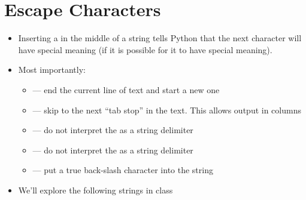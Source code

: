 \documentclass[letterpaper,10pt,english]{sphinxmanual}
\begin{document}
\section{Escape Characters}
\label{\detokenize{lecture_notes/lec03_strings:escape-characters}}\begin{itemize}
\item {} 
Inserting a \sphinxcode{\sphinxupquote{\textbackslash{}}} in the middle of a string tells Python that the
next character will have special meaning (if it is possible for it to
have special meaning).

\item {} 
Most importantly:
\begin{itemize}
\item {} 
 — end the current line of text and start a new one

\item {} 
 — skip to the next “tab stop” in the text. This allows
output in columns

\item {} 
 — do not interpret the  as a string delimiter

\item {} 
 — do not interpret the  as a string delimiter

\item {} 
\sphinxcode{\sphinxupquote{\textbackslash{}\textbackslash{}}} — put a true back-slash character into the string

\end{itemize}

\item {} 
We’ll explore the following strings in class

%
\begin{sphinxVerbatim}[commandchars=\\\{\}]
  
  
\end{sphinxVerbatim}

\end{itemize}
\end{document}
